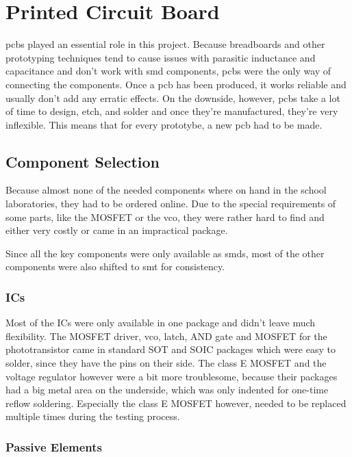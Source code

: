 \chapter{Printed Circuit Board}

\glspl{pcb} played an essential role in this project. Because breadboards and other prototyping techniques tend to cause issues with parasitic inductance and capacitance and don't work with \gls{smd} components, \glspl{pcb} were the only way of connecting the components. Once a \gls{pcb} has been produced, it works reliable and usually don't add any erratic effects. On the downside, however, \glspl{pcb} take a lot of time to design, etch, and solder and once they're manufactured, they're very inflexible. This means that for every prototybe, a new \gls{pcb} had to be made.

\section{Component Selection}

Because almost none of the needed components where on hand in the school laboratories, they had to be ordered online. Due to the special requirements of some parts, like the MOSFET or the \gls{vco}, they were rather hard to find and either very costly or came in an impractical package.

Since all the key components were only available as \glspl{smd}, most of the other components were also shifted to \gls{smt} for consistency.


\subsection{ICs}

Most of the ICs were only available in one package and didn't leave much flexibility. The MOSFET driver, \gls{vco}, latch, AND gate and MOSFET for the phototransistor came in standard SOT and SOIC packages which were easy to solder, since they have the pins on their side. The class E MOSFET and the voltage regulator however were a bit more troublesome, because their packages had a big metal area on the underside, which was only indented for one-time reflow soldering. Especially the class E MOSFET however, needed to be replaced multiple times during the testing process.

\subsection{Passive Elements}

